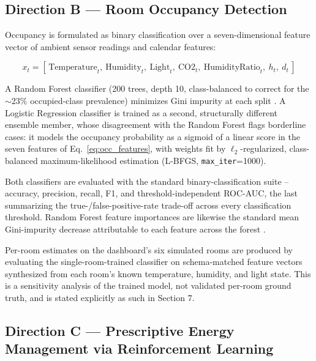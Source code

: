 \documentclass[11pt,a4paper]{article}
\begin{document}
\subsection{Direction B --- Room Occupancy Detection}

Occupancy is formulated as binary classification over a seven-dimensional feature vector of ambient sensor readings and calendar features:

\begin{equation}
x_t = \left[\, \mathrm{Temperature}_t,\ \mathrm{Humidity}_t,\ \mathrm{Light}_t,\ \mathrm{CO2}_t,\ \mathrm{HumidityRatio}_t,\ h_t,\ d_t \,\right]
\label{eq:occ_features}
\end{equation}

A Random Forest classifier (200 trees, depth 10, class-balanced to correct for the $\sim$23\% occupied-class prevalence) minimizes Gini impurity at each split \citep{breiman1984}. A Logistic Regression classifier \citep{cox1958,hosmer2013} is trained as a second, structurally different ensemble member, whose disagreement with the Random Forest flags borderline cases: it models the occupancy probability as a sigmoid of a linear score in the seven features of Eq.~\eqref{eq:occ_features}, with weights fit by $\ell_2$-regularized, class-balanced maximum-likelihood estimation (L-BFGS, \texttt{max\_iter}=1000).

Both classifiers are evaluated with the standard binary-classification suite -- accuracy, precision, recall, F1, and threshold-independent ROC-AUC, the last summarizing the true-/false-positive-rate trade-off across every classification threshold. Random Forest feature importances are likewise the standard mean Gini-impurity decrease attributable to each feature across the forest \citep{breiman1984}.

Per-room estimates on the dashboard's six simulated rooms are produced by evaluating the single-room-trained classifier on schema-matched feature vectors synthesized from each room's known temperature, humidity, and light state. This is a sensitivity analysis of the trained model, not validated per-room ground truth, and is stated explicitly as such in Section 7.

\subsection{Direction C --- Prescriptive Energy Management via Reinforcement Learning}
\end{document}
